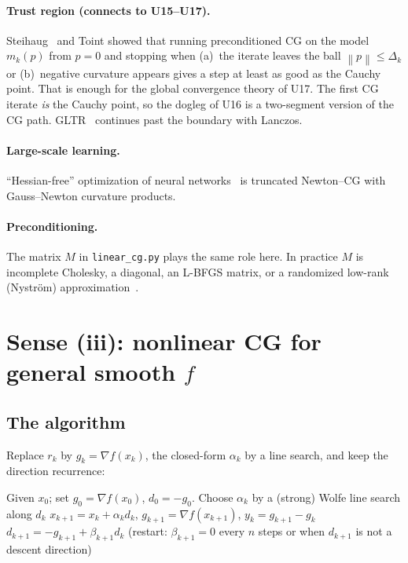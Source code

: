 \documentclass[11pt,a4paper]{article}
\theoremstyle{remark}
\newcommand{\norm}[1]{\left\lVert #1\right\rVert}
\begin{document}
\paragraph{Trust region (connects to U15--U17).} Steihaug~\cite{Steihaug1983} and Toint showed that running preconditioned CG on the model $m_k(p)$ from $p=0$ and stopping when (a)~the iterate leaves the ball $\norm{p}\le\Delta_k$ or (b)~negative curvature appears gives a step at least as good as the Cauchy point. That is enough for the global convergence theory of U17. The first CG iterate \emph{is} the Cauchy point, so the dogleg of U16 is a two-segment version of the CG path. GLTR~\cite{GouldLucidiRomaToint1999} continues past the boundary with Lanczos.

\paragraph{Large-scale learning.} ``Hessian-free'' optimization of neural networks~\cite{Martens2010} is truncated Newton--CG with Gauss--Newton curvature products.

\paragraph{Preconditioning.} The matrix $M$ in \texttt{linear\_cg.py} plays the same role here. In practice $M$ is incomplete Cholesky, a diagonal, an L-BFGS matrix, or a randomized low-rank (Nystr\"om) approximation~\cite{Benzi2002,FrangellaTroppUdell2023}.

\section{Sense (iii): nonlinear CG for general smooth $f$}
\label{sec:ncg}
\subsection{The algorithm}
Replace $r_k$ by $g_k=\nabla f(x_k)$, the closed-form $\alpha_k$ by a line search, and keep the direction recurrence:

\begin{algorithm}[h]
\caption{Nonlinear CG (Fletcher--Reeves 1964~\cite{FletcherReeves1964} and successors)}
\begin{algorithmic}[1]
\State Given $x_0$; set $g_0=\nabla f(x_0)$, $d_0=-g_0$.
\For{$k=0,1,2,\dots$ until $\norm{g_k}\le\varepsilon$}
  \State Choose $\alpha_k$ by a (strong) Wolfe line search along $d_k$ 
  \State $x_{k+1}=x_k+\alpha_k d_k$, \quad $g_{k+1}=\nabla f(x_{k+1})$, \quad $y_k=g_{k+1}-g_k$
  \State $d_{k+1}=-g_{k+1}+\beta_{k+1}d_k$ \quad (restart: $\beta_{k+1}=0$ every $n$ steps or when $d_{k+1}$ is not a descent direction)
\EndFor
\end{algorithmic}
\end{algorithm}
\end{document}
